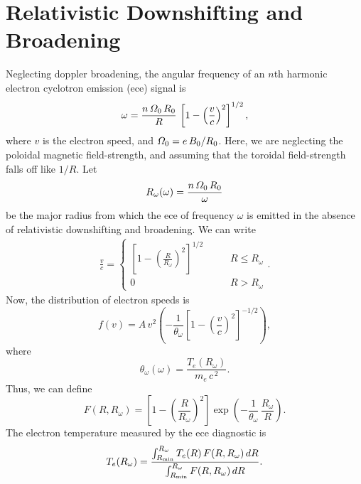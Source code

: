 \documentclass[12pt,prb,aps,notitlepage]{revtex4-1}
\begin{document}
\section{Relativistic Downshifting and Broadening}
Neglecting doppler broadening, the angular frequency of an $n$th harmonic electron cyclotron emission (ece) signal is
\begin{equation}
\omega = \frac{n\,{\mit\Omega}_0\,R_0}{R}\,\left[1-\left(\frac{v}{c}\right)^2\right]^{1/2},
\end{equation}
where $v$ is the electron speed, and ${\mit\Omega}_0=e\,B_0/R_0$. Here, we are neglecting the poloidal magnetic field-strength, and assuming that the toroidal
field-strength falls off like $1/R$. Let
\begin{equation}
R_\omega(\omega) = \frac{n\,{\mit\Omega}_0\,R_0}{\omega}
\end{equation}
be the major radius from which the ece of frequency $\omega$ is emitted  in the absence of relativistic downshifting and broadening. We can write
\begin{align}
\frac{v}{c} =\left\{\begin{array}{ccc}\left[1-\left(\frac{R}{R_\omega}\right)^2\right]^{1/2} &~~~~~&R\leq R_\omega\\[0.5ex]
0&&R>R_\omega
\end{array}\right..
\end{align}
Now, the distribution of electron speeds is
\begin{equation}
f(v)= A\,v^2\left(-\frac{1}{\theta_\omega}\left[1-\left(\frac{v}{c}\right)^2\right]^{-1/2}\right),
\end{equation}
where
\begin{equation}
\theta_\omega(\omega) = \frac{T_e(R_\omega)}{m_e\,c^{\,2}}.
\end{equation}
Thus, we can define
\begin{equation}
F(R,R_\omega) = \left[1-\left(\frac{R}{R_\omega}\right)^2\right]\exp\!\left(-\frac{1}{\theta_\omega}\,\frac{R_\omega}{R}\right).
\end{equation}
The electron temperature measured by the ece diagnostic is
\begin{equation}
T_e(R_\omega) = \frac{\int_{R_{\rm min}}^{R_\omega} T_e(R)\,F(R,R_\omega)\,dR}
                                     {\int_{R_{\rm min}}^{R_\omega}             F(R,R_\omega)\,dR}.
\end{equation}
\end{document}

